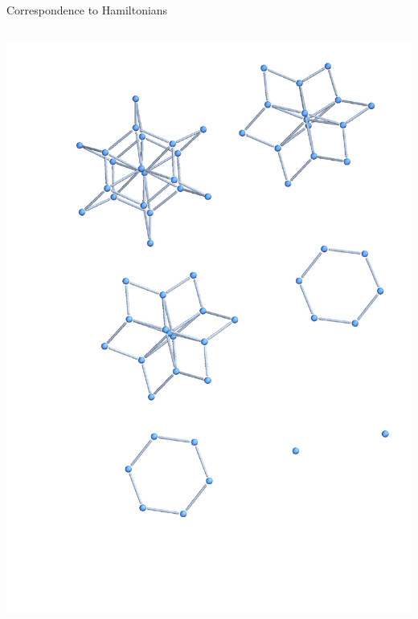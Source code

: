 \documentclass{beamer}
\begin{document}
\begin{frame}{Correspondence to Hamiltonians}
\begin{columns}[T]
{\begin{column}{0.33\textwidth}
    		\includegraphics[trim=0 0 0 0mm, width=\textwidth]{Images/ring6_hamilton_graph3d}
		\end{column}}
\end{columns}
\end{frame}
\end{document}
